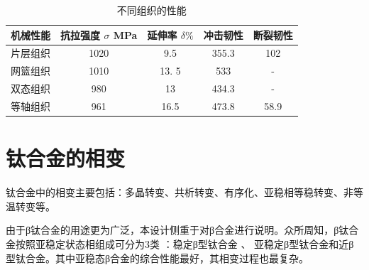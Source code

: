 \begin{table}[htbp]
	\centering
	\label{sec:detial}
	\caption{不同组织的性能}
	\begin{tabular}{ccccc}
		\toprule
		机械性能 & 抗拉强度 $ \sigma$ MPa & 延伸率 $\delta\%$ & 冲击韧性& 断裂韧性 \\  \midrule
		片层组织 & 1020 & 9.5 & 355.3 & 102 \\
		网篮组织 & 1010 & 13. 5 & 533 & - \\
		双态组织 & 980 & 13 & 434.3 & - \\
		等轴组织 & 961 & 16.5 & 473.8 & 58.9 \\ \bottomrule
	\end{tabular}
\end{table}
\section{钛合金的相变}
钛合金中的相变主要包括：多晶转变、共析转变、有序化、亚稳相等稳转变、非等温转变等。


由于β钛合金的用途更为广泛，本设计侧重于对β合金进行说明。众所周知，β钛合金按照亚稳定状态相组成可分为3类 ：稳定β型钛合金 、 亚稳定β型钛合金和近β型钛合金。其中亚稳态β合金的综合性能最好，其相变过程也最复杂。


